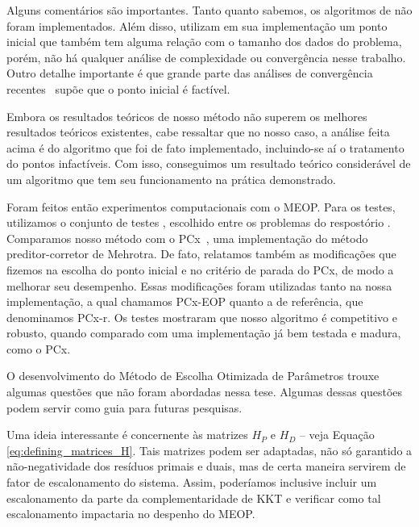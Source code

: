 Alguns  comentários são importantes. Tanto quanto sabemos, os algoritmos de \textcite{Zhang:1996it,Zhang:2006ic,Wright:1996kj} não foram implementados. Além disso, \textcite{Gertz:2003ji} utilizam em sua implementação um ponto inicial que também tem alguma relação com o tamanho dos dados do problema, porém, não há qualquer análise de complexidade ou convergência nesse trabalho. Outro detalhe importante é que  grande parte das análises de convergência recentes~\cite{Gondzio:2011ta} supõe que o ponto inicial é factível. 

Embora os resultados teóricos de nosso método  não superem os melhores resultados teóricos existentes, cabe ressaltar que no nosso caso, a análise feita acima é do algoritmo que foi de fato implementado, incluindo-se aí o tratamento do pontos infactíveis. Com isso, conseguimos um resultado teórico considerável de um algoritmo que tem seu funcionamento na prática demonstrado.



Foram feitos então experimentos computacionais com o MEOP.  Para os testes, utilizamos o conjunto de testes , escolhido entre os problemas do respostório \Netlib. Comparamos nosso método com o PCx~\cite{Czyzyk:1999hk}, uma implementação do método preditor-corretor de Mehrotra. De fato, relatamos também as modificações que fizemos na escolha do ponto inicial e no critério de parada do PCx, de modo a melhorar seu desempenho. Essas modificações foram utilizadas tanto na nossa implementação, a qual chamamos PCx-EOP quanto a de referência, que denominamos PCx-r. Os testes mostraram que nosso algoritmo é competitivo e robusto, quando comparado com uma implementação já bem testada e madura, como o PCx. 





O desenvolvimento do Método de Escolha Otimizada de Parâmetros trouxe algumas questões que 
não foram  abordadas nessa tese. Algumas dessas questões podem servir como guia para futuras pesquisas.

Uma ideia interessante é concernente às matrizes $H_P$ e $H_D$  -- veja Equação
\eqref{eq:defining_matrices_H}. Tais matrizes podem ser adaptadas, não só garantido a
não-negatividade dos resíduos primais e duais, mas de certa maneira servirem de  fator de escalonamento do sistema. Assim, poderíamos inclusive incluir um escalonamento da parte da complementaridade de KKT e verificar como tal escalonamento impactaria no despenho do MEOP.


